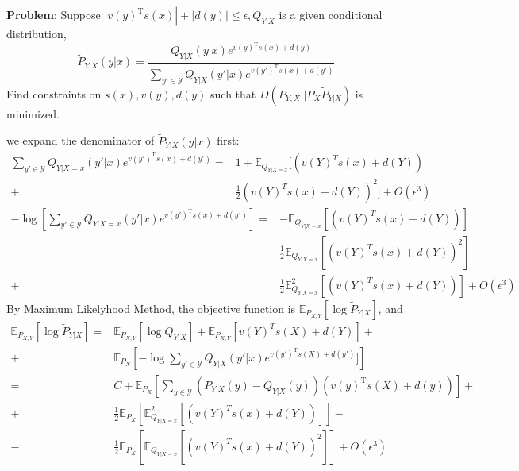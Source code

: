 \documentclass{article}
\def\T{\mathrm{T}}
\def\E{\mathbb{E}}
\begin{document}
\textbf{Problem}: Suppose $|v(y)^\T s(x)|+|d(y)|\leq \epsilon,Q_{Y|X}$ is a given conditional distribution,$$\tilde{P}_{Y|X}(y|x)=\frac{Q_{Y|X}(y|x) e^{v(y)^\T s(x)+d(y)}}{\sum_{y'\in \mathcal{Y}} Q_{Y|X}(y'|x) e^{v(y')^\T s(x)+d(y')}}$$
Find constraints on $s(x),v(y),d(y)$ such that $D(P_{Y,X}||P_X \tilde{P}_{Y|X})$ is minimized.


we expand the denominator of $\tilde{P}_{Y|X}(y|x)$ first:
\begin{align*}
\sum_{y'\in \mathcal{Y}} Q_{Y|X=x}(y'|x) e^{v(y')^\T s(x)+d(y')}=&
1+\E_{Q_{Y|X=x}}[(v(Y)^T s(x)+d(Y))\\
+&\frac{1}{2}(v(Y)^T s(x)+d(Y))^2]+O(\epsilon^3)
\end{align*}
\begin{align*}
-\log\left[\sum_{y'\in \mathcal{Y}} Q_{Y|X=x}(y'|x) e^{v(y')^\T s(x)+d(y')}\right]=&
-\E_{Q_{Y|X=x}}[(v(Y)^T s(x)+d(Y))] \\
-&\frac{1}{2}\E_{Q_{Y|X=x}}[(v(Y)^T s(x)+d(Y))^2]\\
+&\frac{1}{2}  \E^2_{Q_{Y|X=x}}[(v(Y)^T s(x)+d(Y))]+O(\epsilon^3)
\end{align*}
By Maximum Likelyhood Method, the objective function is $\E_{P_{X,Y}}[\log \tilde{P}_{Y|X}]$, and 
\begin{align*}
\E_{P_{X,Y}}[\log \tilde{P}_{Y|X}]=&\E_{P_{X,Y}}[\log Q_{Y|X}]+ \E_{P_{X,Y}}[v(Y)^T s(X)+d(Y)]+\\%
+&\E_{P_X}\left[-\log\sum_{y'\in \mathcal{Y}} Q_{Y|X}(y'|x) e^{v(y')^\T s(X)+d(y')}]\right]\\
=& C +  \E_{P_X}\left[\sum_{y\in \mathcal{Y}}(P_{Y|X}(y)-Q_{Y|X}(y))(v(y)^\T s(X)+d(y))\right]+\\
+&\frac{1}{2}\E_{P_X}\left[\E^2_{Q_{Y|X=x}}[(v(Y)^T s(x)+d(Y))]\right]-\\
-&\frac{1}{2}\E_{P_X}\left[\E_{Q_{Y|X=x}}[(v(Y)^T s(x)+d(Y))^2]\right]+ O(\epsilon^3)
\end{align*}
\end{document}
